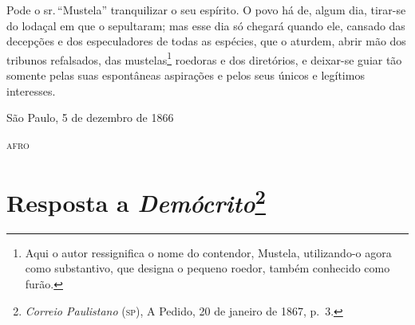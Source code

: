 Pode o sr.\,``Mustela'' tranquilizar o seu espírito. O povo há de, algum
dia, tirar-se do lodaçal em que o sepultaram; mas esse dia só chegará
quando ele, cansado das decepções e dos especuladores de todas as
espécies, que o aturdem, abrir mão dos tribunos refalsados, das
mustelas\footnote{Aqui o autor ressignifica o nome do contendor,
  Mustela, utilizando-o agora como substantivo, que designa o pequeno
  roedor, também conhecido como furão.} roedoras e dos diretórios, e
deixar-se guiar tão somente pelas suas espontâneas aspirações e pelos
seus únicos e legítimos interesses.

\begin{flushright}
São Paulo, 5 de dezembro de 1866

\textsc{afro}
\end{flushright}

\chapter{Resposta a \emph{Demócrito}\footnote{\emph{Correio
  Paulistano} (\textsc{sp}), A Pedido, 20 de janeiro de 1867, p.~3.}}

